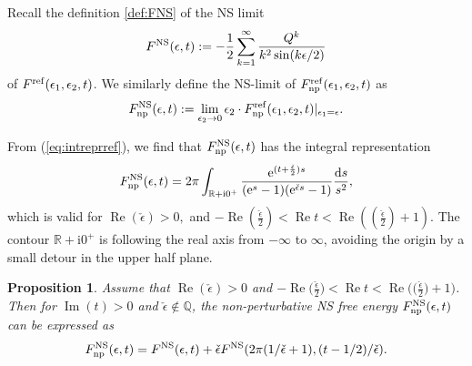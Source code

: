 \documentclass[pdftex]{sigma}
\numberwithin{equation}{section}
\newtheorem{Proposition}[Theorem]{Proposition}
 { \theoremstyle{definition}
\newtheorem{Definition}[Theorem]{Definition}
\newtheorem{Note}[Theorem]{Note}
\newtheorem{Example}[Theorem]{Example}
\newtheorem{Remark}[Theorem]{Remark} }
\begin{document}
Recall the definition \eqref{def:FNS} of the NS limit
\begin{gather*}
 F^{\rm NS}(\epsilon,t) := - \frac{1}{2} \sum_{k=1}^{\infty} \frac{Q^k}{k^2 \sin(k\epsilon/2)}
 \end{gather*}
of $F^{\rm ref}(\epsilon_1,\epsilon_2,t)$.
We similarly define the NS-limit of $F_{{\rm np}}^{\rm ref}(\epsilon_1,\epsilon_2,t)$ as
\begin{equation}\label{eqn:FNSnpfirst}
 F^{\rm NS}_{{\rm np}}(\epsilon,t):= \lim_{\epsilon_2\rightarrow 0} \epsilon_2\cdot F^{{\rm ref}}_{{\rm np}}(\epsilon_1,\epsilon_2,t)|_{\epsilon_1=\epsilon}.
\end{equation}

From (\ref{eq:intreprref}), we find that $F^{\rm NS}_{{\rm np}}(\epsilon,t)$ has the integral representation
\begin{equation}\label{eq:FNSintegral}
F^{\rm NS}_{{\rm np}}(\epsilon,t) = 2\pi \int_{\mathbb{R}+\mathrm{i} 0^{+}} \frac{{\rm e}^{(t+\frac{\check\epsilon}{2} )s}}{({\rm e}^s-1)({\rm e}^{\check{\epsilon}s}-1) } \frac{{\rm d}s}{s^2},
\end{equation}
which is valid for $\operatorname{Re} (\check{\epsilon}) >0,$ and $-\operatorname{Re}\left(\frac{\check{\epsilon}}{2} \right) < \operatorname{Re} t < \operatorname{Re} \left(\left(\frac{\check{\epsilon}}{2}\right)+1\right)$. The contour $\mathbb{R}+\mathrm{i} 0^{+}$ is following the real axis from $-\infty$ to $\infty$, avoiding the origin by a small detour in the upper half plane.

\begin{Proposition} Assume that $\operatorname{Re} (\check{\epsilon}) >0$ and $-\operatorname{Re}\big(\frac{\check{\epsilon}}{2} \big) < \operatorname{Re} t < \operatorname{Re} \big(\big(\frac{\check{\epsilon}}{2}\big)+1\big)$. Then for $\operatorname{Im}(t)>0$ and $\check\epsilon \notin \mathbb{Q}$, the non-perturbative NS free energy
$F^{\rm NS}_{{\rm np}}(\epsilon,t)$ can be expressed as
\begin{equation}\label{FnpFNS}
 F^{\rm NS}_{{\rm np}}(\epsilon,t)=F^{\rm NS}(\epsilon,t) + \check{\epsilon} F^{\rm NS}(2\pi (1/\check{\epsilon}+1),(t-1/2)/\check{\epsilon}).
\end{equation}
\end{Proposition}
\end{document}
